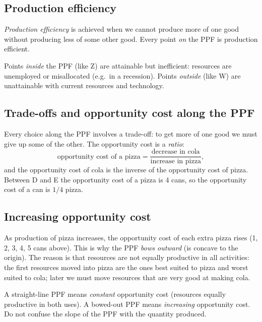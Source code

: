 \subsection{Production efficiency}

\begin{definition}
\emph{Production efficiency} is achieved when we cannot produce more of one good without
producing less of some other good. Every point \emph{on} the PPF is production efficient.
\end{definition}

Points \emph{inside} the PPF (like Z) are attainable but inefficient: resources are
unemployed or misallocated (e.g.\ in a recession). Points \emph{outside} (like W) are
unattainable with current resources and technology.

\subsection{Trade-offs and opportunity cost along the PPF}

Every choice along the PPF involves a trade-off: to get more of one good we must give up
some of the other. The opportunity cost is a \emph{ratio}:
\[
  \text{opportunity cost of a pizza}
  = \frac{\text{decrease in cola}}{\text{increase in pizza}},
\]
and the opportunity cost of cola is the inverse of the opportunity cost of pizza. Between
D and E the opportunity cost of a pizza is 4 cans, so the opportunity cost of a can is
$1/4$ pizza.

\subsection{Increasing opportunity cost}

As production of pizza increases, the opportunity cost of each extra pizza rises
(1, 2, 3, 4, 5 cans above). This is why the PPF \emph{bows outward} (is concave to the
origin). The reason is that resources are not equally productive in all activities:
the first resources moved into pizza are the ones best suited to pizza and worst suited to
cola; later we must move resources that are very good at making cola.

\begin{important}[Pitfall]
A straight-line PPF means \emph{constant} opportunity cost (resources equally productive
in both uses). A bowed-out PPF means \emph{increasing} opportunity cost. Do not confuse
the slope of the PPF with the quantity produced.
\end{important}

